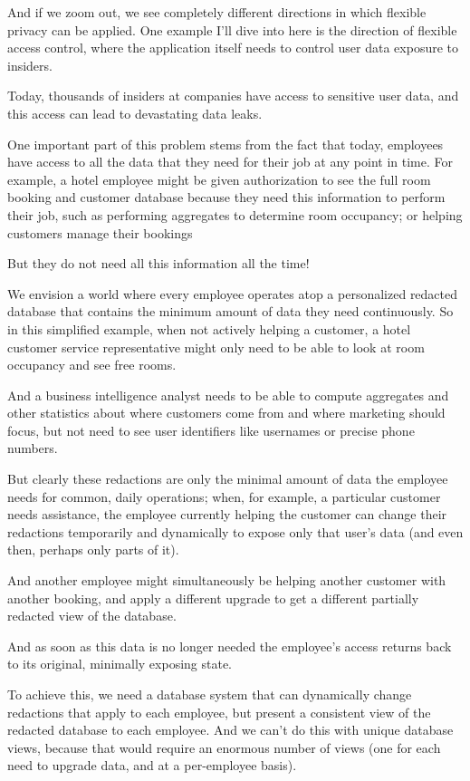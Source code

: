 And if we zoom out, we see completely different directions in which flexible privacy can be applied. One example I’ll dive into here is the direction of flexible access control, where the application itself needs to control user data exposure to insiders.

Today, thousands of insiders at companies have access to sensitive user data, and this access can lead to devastating data leaks.

One important part of this problem stems from the fact that today, employees have access to all the data that they need for their job at any point in time. For example, a hotel employee might be given authorization to see the full room booking and customer database because they need this information to perform their job, such as performing aggregates to determine room occupancy; or helping customers manage their bookings

But they do not need all this information all the time!


We envision a world where every employee operates atop a personalized redacted database that contains the minimum amount of data they need continuously. So in this simplified example, when not actively helping a customer, a hotel customer service representative might only need to be able to look at room occupancy and see free rooms.

And a business intelligence analyst needs to be able to compute aggregates and other statistics about where customers come from and where marketing should focus, but not need to see user identifiers like usernames or precise phone numbers.


But clearly these redactions are only the minimal amount of data the employee needs for common, daily operations; when, for example, a particular customer needs assistance, the employee currently helping the customer can change their redactions temporarily and dynamically to expose only that user’s data (and even then, perhaps only parts of it).

And another employee might simultaneously be helping another customer with another booking, and apply a different upgrade to get a different partially redacted view of the database.

And as soon as this data is no longer needed the employee’s access returns back to its original, minimally exposing state.

To achieve this, we need a database system that can dynamically change redactions that apply to each employee, but present a consistent view of the redacted database to each employee.
And we can’t do this with unique database views, because that would require an enormous number of views (one for each need to upgrade data, and at a per-employee basis).

